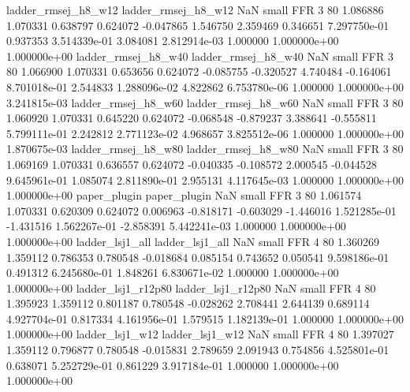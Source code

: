     ladder_rmsej_h8_w12      ladder_rmsej_h8_w12                   NaN      small      FFR                 3 80 1.086886       1.070331 0.638797       0.624072   -0.047865      1.546750      2.359469     0.346651   7.297750e-01  0.937353 3.514339e-01     3.084081   2.812914e-03            1.000000    1.000000e+00        1.000000e+00
     ladder_rmsej_h8_w40      ladder_rmsej_h8_w40                   NaN      small      FFR                 3 80 1.066900       1.070331 0.653656       0.624072   -0.085755     -0.320527      4.740484    -0.164061   8.701018e-01  2.544833 1.288096e-02     4.822862   6.753780e-06            1.000000    1.000000e+00        3.241815e-03
     ladder_rmsej_h8_w60      ladder_rmsej_h8_w60                   NaN      small      FFR                 3 80 1.060920       1.070331 0.645220       0.624072   -0.068548     -0.879237      3.388641    -0.555811   5.799111e-01  2.242812 2.771123e-02     4.968657   3.825512e-06            1.000000    1.000000e+00        1.870675e-03
     ladder_rmsej_h8_w80      ladder_rmsej_h8_w80                   NaN      small      FFR                 3 80 1.069169       1.070331 0.636557       0.624072   -0.040335     -0.108572      2.000545    -0.044528   9.645961e-01  1.085074 2.811890e-01     2.955131   4.117645e-03            1.000000    1.000000e+00        1.000000e+00
            paper_plugin             paper_plugin                   NaN      small      FFR                 3 80 1.061574       1.070331 0.620309       0.624072    0.006963     -0.818171     -0.603029    -1.446016   1.521285e-01 -1.431516 1.562267e-01    -2.858391   5.442241e-03            1.000000    1.000000e+00        1.000000e+00
         ladder_lsj1_all          ladder_lsj1_all                   NaN      small      FFR                 4 80 1.360269       1.359112 0.786353       0.780548   -0.018684      0.085154      0.743652     0.050541   9.598186e-01  0.491312 6.245680e-01     1.848261   6.830671e-02            1.000000    1.000000e+00        1.000000e+00
      ladder_lsj1_r12p80       ladder_lsj1_r12p80                   NaN      small      FFR                 4 80 1.395923       1.359112 0.801187       0.780548   -0.028262      2.708441      2.644139     0.689114   4.927704e-01  0.817334 4.161956e-01     1.579515   1.182139e-01            1.000000    1.000000e+00        1.000000e+00
         ladder_lsj1_w12          ladder_lsj1_w12                   NaN      small      FFR                 4 80 1.397027       1.359112 0.796877       0.780548   -0.015831      2.789659      2.091943     0.754856   4.525801e-01  0.638071 5.252729e-01     0.861229   3.917184e-01            1.000000    1.000000e+00        1.000000e+00
